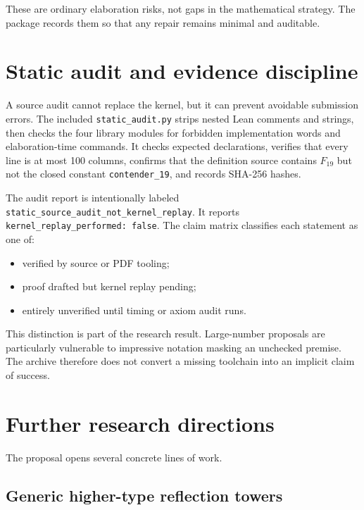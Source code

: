 \documentclass[11pt]{article}
\theoremstyle{definition}
\theoremstyle{remark}
\newcommand{\leanname}[1]{\nolinkurl{#1}}
\newcommand{\code}[1]{\texttt{#1}}
\begin{document}
These are ordinary elaboration risks, not gaps in the mathematical strategy.
The package records them so that any repair remains minimal and auditable.

\section{Static audit and evidence discipline}

A source audit cannot replace the kernel, but it can prevent avoidable
submission errors.  The included \leanname{static_audit.py} strips nested Lean
comments and strings, then checks the four library modules for forbidden
implementation words and elaboration-time commands.  It checks expected
declarations, verifies that every line is at most 100 columns, confirms that the
definition source contains $F_{19}$ but not the closed constant
\leanname{contender_19}, and records SHA-256 hashes.

The audit report is intentionally labeled
\code{static\_source\_audit\_not\_kernel\_replay}.  It reports
\code{kernel\_replay\_performed: false}.  The claim matrix classifies each
statement as one of:

\begin{itemize}[leftmargin=*]
\item verified by source or PDF tooling;
\item proof drafted but kernel replay pending;
\item entirely unverified until timing or axiom audit runs.
\end{itemize}

This distinction is part of the research result.  Large-number proposals are
particularly vulnerable to impressive notation masking an unchecked premise.
The archive therefore does not convert a missing toolchain into an implicit
claim of success.

\section{Further research directions}

The proposal opens several concrete lines of work.

\subsection{Generic higher-type reflection towers}
\end{document}
